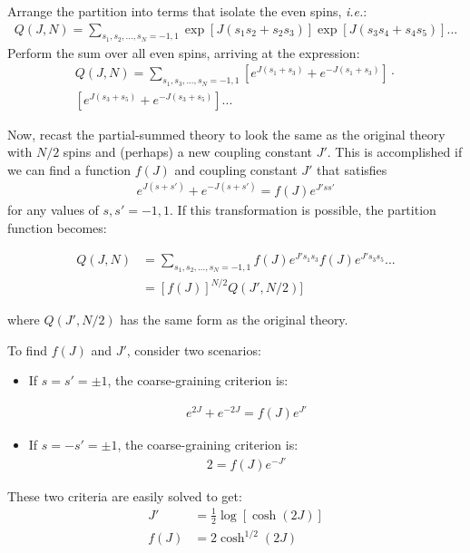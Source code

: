 \documentclass[book.tex]{subfiles}
\begin{document}
Arrange the partition into terms that isolate the even spins, \textit{i.e.}:
\begin{align}
Q(J,N) = \sum_{s_1,s_2,...,s_N=-1,1}\exp[J(s_1s_2+s_2s_3)]\exp[J(s_3s_4+s_4s_5)]...
\end{align}
Perform the sum over all even spins, arriving at the expression:
\begin{align}
Q(J,N) = \sum_{s_1,s_3,...,s_N=-1,1}\left[e^{J(s_1+s_3)} + e^{-J(s_1+s_3)}\right]\cdot \\ 
\left[e^{J(s_3+s_5)}+e^{-J(s_3+s_5)}\right]...
\end{align}

Now, recast the partial-summed theory to look the same as the original theory with $N/2$ spins and (perhaps) a new coupling constant $J'$. This is accomplished if we can find a function $f (J)$ and coupling constant $J'$ that satisfies 
\begin{align}
e^{J(s+s')}+e^{-J(s+s')} = f(J)e^{J'ss'}
\end{align} 
for any values of $s, s' = -1,1$. If this transformation is possible, the partition function becomes:

\begin{align}\label{Eq2}
Q(J,N) &= \sum_{s_1,s_2,...,s_N=-1,1} f(J) e^{J's_1s_3}f(J) e^{J's_3s_5}... \\
&= [f(J)]^{N/2}Q(J',N/2)]
\end{align}

\noindent where $Q(J',N/2)$ has the same form as the original theory.

To find $f(J)$ and $J'$, consider two scenarios:
\begin{itemize}
\item If $s = s' = \pm 1$, the coarse-graining criterion is:

\begin{align}\label{Eq3}
e^{2J}+e^{-2J}=f(J)e^{J'}
\end{align}
\item If $s = -s' = \pm 1$, the coarse-graining criterion is:
\begin{align}\label{Eq4}
2=f(J)e^{-J'}
\end{align}
\end{itemize}

These two criteria are easily solved to get:
\begin{align}
J' &= \frac{1}{2} \log [\cosh(2J)]\\
f(J) &= 2\cosh^{1/2}(2J) 
\end{align}
\end{document}
